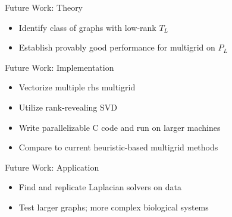 \documentclass[xcolor=dvipsnames,10pt]{beamer}
\begin{document}
\begin{frame}{Future Work: Theory}
\Large
\vspace{.2in}
\begin{itemize}
\item 

Identify class of graphs with low-rank $T_L$
\vspace{.2in}
\item
Establish provably good performance for multigrid on $P_L$


\medskip
\end{itemize}
\normalsize
\end{frame}

\begin{frame}{Future Work: Implementation}
\Large

\vspace{.2in}
\begin{itemize}

\item Vectorize multiple rhs multigrid
\vspace{.1in}
\item Utilize rank-revealing SVD
\vspace{.1in}
\item Write parallelizable C code and run on larger machines
\vspace{.1in}
\item Compare to current heuristic-based multigrid methods

\end{itemize}
\end{frame}

\begin{frame}{Future Work: Application}
\Large

\vspace{.2in}

\begin{itemize}
\item Find and replicate Laplacian solvers on data
\vspace{.2in}
\item Test larger graphs; more complex biological systems

\end{itemize}
 

\end{frame}
\end{document}
